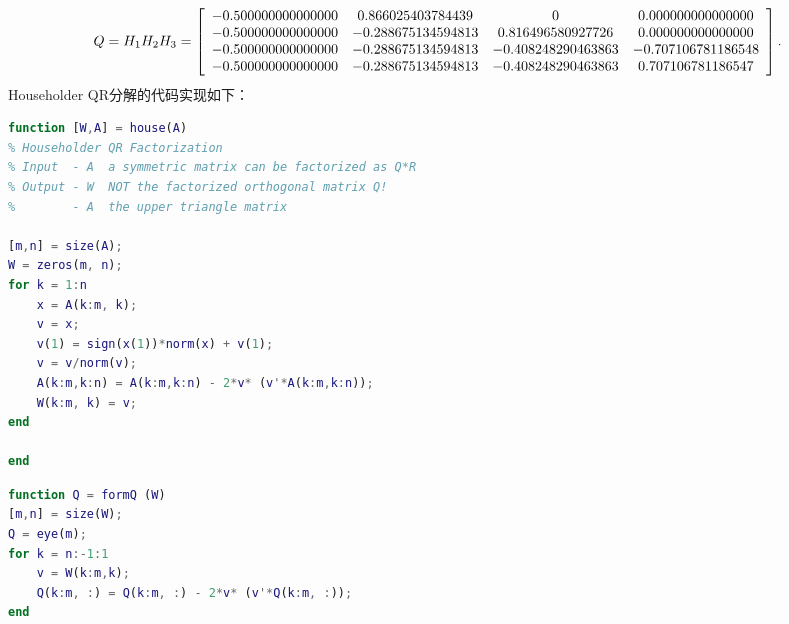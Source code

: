 \documentclass[UTF8]{ctexart}
\begin{document}
\begin{align}
	Q = H_{1}H_{2}H_{3} = 
	\left[\begin{array}{cccc}
	-0.500000000000000 &  0.866025403784439 &                  0 &  0.000000000000000 \\
	-0.500000000000000 & -0.288675134594813 &  0.816496580927726 &  0.000000000000000 \\
	-0.500000000000000 & -0.288675134594813 & -0.408248290463863 & -0.707106781186548 \\
	-0.500000000000000 & -0.288675134594813 & -0.408248290463863 &  0.707106781186547
	\end{array}\right].\notag
\end{align}
Householder QR分解的代码实现如下：
\begin{lstlisting}[language=matlab]
function [W,A] = house(A)
% Householder QR Factorization
% Input  - A  a symmetric matrix can be factorized as Q*R
% Output - W  NOT the factorized orthogonal matrix Q!
%        - A  the upper triangle matrix

[m,n] = size(A);
W = zeros(m, n);
for k = 1:n
	x = A(k:m, k);
	v = x;
	v(1) = sign(x(1))*norm(x) + v(1);
	v = v/norm(v);
	A(k:m,k:n) = A(k:m,k:n) - 2*v* (v'*A(k:m,k:n));
	W(k:m, k) = v;
end

end
\end{lstlisting}
\begin{lstlisting}[language=matlab]
function Q = formQ (W)
[m,n] = size(W);
Q = eye(m);
for k = n:-1:1
	v = W(k:m,k);
	Q(k:m, :) = Q(k:m, :) - 2*v* (v'*Q(k:m, :));
end
\end{lstlisting}
\end{document}
